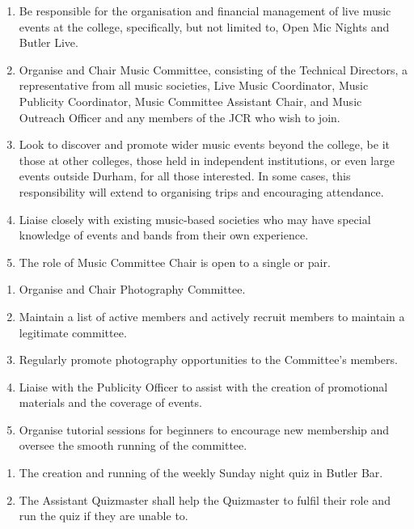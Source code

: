 \begin{enumerate}
    \item Be responsible for the organisation and financial management of live music events at the college, specifically, but not limited to, Open Mic Nights and Butler Live.
    \item Organise and Chair Music Committee, consisting of the Technical Directors, a representative from all music societies, Live Music Coordinator, Music Publicity Coordinator, Music Committee Assistant Chair, and Music Outreach Officer and any members of the JCR who wish to join.
    \item Look to discover and promote wider music events beyond the college, be it those at other colleges, those held in independent institutions, or even large events outside Durham, for all those interested. In some cases, this responsibility will extend to organising trips and encouraging attendance.
    \item Liaise closely with existing music-based societies who may have special knowledge of events and bands from their own experience.
    \item The role of Music Committee Chair is open to a single or pair.
    
\end{enumerate}

\begin{enumerate}
    \item Organise and Chair Photography Committee.
    \item Maintain a list of active members and actively recruit members to maintain a legitimate committee.
    \item Regularly promote photography opportunities to the Committee’s members.
    \item Liaise with the Publicity Officer to assist with the creation of promotional materials and the coverage of events.
    \item Organise tutorial sessions for beginners to encourage new membership and oversee the smooth running of the committee.
    
\end{enumerate}

\begin{enumerate}
    \item The creation and running of the weekly Sunday night quiz in Butler Bar.
    \item The Assistant Quizmaster shall help the Quizmaster to fulfil their role and run the quiz if they are unable to.
    
\end{enumerate}

